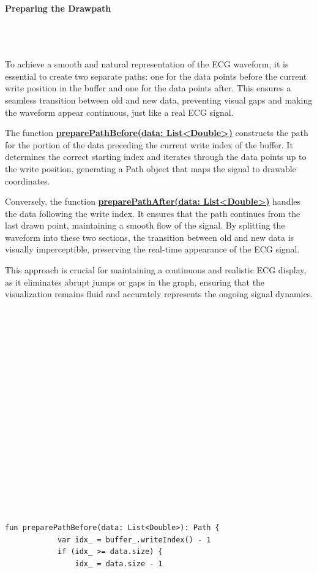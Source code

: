 {{	
	\mbox{}\\
	\mbox{}\\
	\paragraph{Preparing the Drawpath}\mbox{}\\
	\mbox{}\\
	{\large 
		To achieve a smooth and natural representation of the ECG waveform, it is essential to create two separate paths: one for the data points before the current write position in the buffer and one for the data points after. This ensures a seamless transition between old and new data, preventing visual gaps and making the waveform appear continuous, just like a real ECG signal.
		
		The function \underline{\textbf{preparePathBefore(data: List<Double>)}} constructs the path for the portion of the data preceding the current write index of the buffer. It determines the correct starting index and iterates through the data points up to the write position, generating a Path object that maps the signal to drawable coordinates.
		
		Conversely, the function \underline{\textbf{preparePathAfter(data: List<Double>)}} handles the data following the write index. It ensures that the path continues from the last drawn point, maintaining a smooth flow of the signal. By splitting the waveform into these two sections, the transition between old and new data is visually imperceptible, preserving the real-time appearance of the ECG signal.
		
		This approach is crucial for maintaining a continuous and realistic ECG display, as it eliminates abrupt jumps or gaps in the graph, ensuring that the visualization remains fluid and accurately represents the ongoing signal dynamics.}
		\mbox{}\\
		\mbox{}\\
		\mbox{}\\
		\mbox{}\\
		\mbox{}\\
		\mbox{}\\
		\mbox{}\\
		\mbox{}\\
		\mbox{}\\
		\mbox{}\\
		\mbox{}\\
		\mbox{}\\
		\mbox{}\\
		\mbox{}\\
		\mbox{}\\
		\mbox{}\\
		\mbox{}\\
	\begin{lstlisting}[label={fig:simpleSourceGen.cs}, caption={Code to prepare the ECG-Path}]
		fun preparePathBefore(data: List<Double>): Path {
			var idx_ = buffer_.writeIndex() - 1
			if (idx_ >= data.size) {
				idx_ = data.size - 1
				

\end{lstlisting}}}
